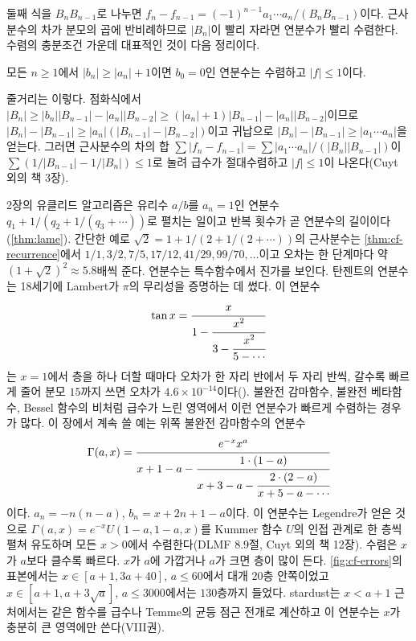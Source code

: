 둘째 식을 $B_nB_{n-1}$로 나누면 $f_n-f_{n-1}=(-1)^{n-1}a_1\cdots a_n/(B_nB_{n-1})$이다. 근사분수의 차가 분모의 곱에 반비례하므로 $|B_n|$이 빨리 자라면 연분수가 빨리 수렴한다. 수렴의 충분조건 가운데 대표적인 것이 다음 정리이다\cite{cuyt2008cf}.

\begin{theorem}
\label{thm:pringsheim}
모든 $n\ge1$에서 $|b_n|\ge|a_n|+1$이면 $b_0=0$인 연분수는 수렴하고 $|f|\le1$이다.
\end{theorem}

줄거리는 이렇다. 점화식에서 $|B_n|\ge|b_n||B_{n-1}|-|a_n||B_{n-2}|\ge(|a_n|+1)|B_{n-1}|-|a_n||B_{n-2}|$이므로 $|B_n|-|B_{n-1}|\ge|a_n|(|B_{n-1}|-|B_{n-2}|)$이고 귀납으로 $|B_n|-|B_{n-1}|\ge|a_1\cdots a_n|$을 얻는다. 그러면 근사분수의 차의 합 $\sum|f_n-f_{n-1}|=\sum|a_1\cdots a_n|/(|B_n||B_{n-1}|)$이 $\sum(1/|B_{n-1}|-1/|B_n|)\le1$로 눌려 급수가 절대수렴하고 $|f|\le1$이 나온다(Cuyt 외의 책 3장).

2장의 유클리드 알고리즘은 유리수 $a/b$를 $a_n=1$인 연분수 $q_1+1/(q_2+1/(q_3+\cdots))$로 펼치는 일이고 반복 횟수가 곧 연분수의 길이이다(\cref{thm:lame}). 간단한 예로 $\sqrt2=1+1/(2+1/(2+\cdots))$의 근사분수는 \cref{thm:cf-recurrence}에서 $1/1,3/2,7/5,17/12,41/29,99/70,\dots$이고 오차는 한 단계마다 약 $(1+\sqrt2)^2\approx5.8$배씩 준다. 연분수는 특수함수에서 진가를 보인다. 탄젠트의 연분수는 18세기에 Lambert가 $\pi$의 무리성을 증명하는 데 썼다. 이 연분수
\[
\tan x=\cfrac{x}{1-\cfrac{x^2}{3-\cfrac{x^2}{5-\cdots}}}
\]
는 $x=1$에서 층을 하나 더할 때마다 오차가 한 자리 반에서 두 자리 반씩, 갈수록 빠르게 줄어 분모 $15$까지 쓰면 오차가 $4.6\times10^{-14}$이다(). 불완전 감마함수, 불완전 베타함수, Bessel 함수의 비처럼 급수가 느린 영역에서 이런 연분수가 빠르게 수렴하는 경우가 많다\cite{cuyt2008cf}. 이 장에서 계속 쓸 예는 위쪽 불완전 감마함수의 연분수
\[
\Gamma(a,x)=\cfrac{e^{-x}x^a}{x+1-a-\cfrac{1\cdot(1-a)}{x+3-a-\cfrac{2\cdot(2-a)}{x+5-a-\cdots}}}
\]
이다. $a_n=-n(n-a)$, $b_n=x+2n+1-a$이다. 이 연분수는 Legendre가 얻은 것으로 $\Gamma(a,x)=e^{-x}U(1-a,1-a,x)$를 Kummer 함수 $U$의 인접 관계로 한 층씩 펼쳐 유도하며 모든 $x>0$에서 수렴한다(DLMF 8.9절, Cuyt 외의 책 12장\cite{dlmf,cuyt2008cf}). 수렴은 $x$가 $a$보다 클수록 빠르다. $x$가 $a$에 가깝거나 $a$가 크면 층이 많이 든다. \cref{fig:cf-errors}의 표본에서는 $x\in[a+1,3a+40]$, $a\le60$에서 대개 $20$층 안쪽이었고 $x\in[a+1,a+3\sqrt a]$, $a\le3000$에서는 $130$층까지 들었다. stardust는 $x<a+1$ 근처에서는 같은 함수를 급수나 Temme의 균등 점근 전개로 계산하고 이 연분수는 $x$가 충분히 큰 영역에만 쓴다(VIII권).

